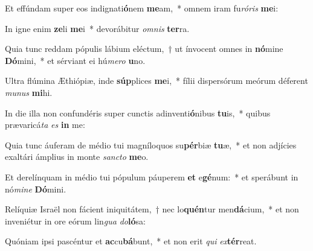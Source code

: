 \item Et effúndam super eos indignati\textbf{ó}nem \textbf{me}am,~* omnem iram fu\textit{ró}\textit{ris} \textbf{me}i:
\item In igne enim \textbf{ze}li \textbf{me}i~* devorábitur \textit{om}\textit{nis} \textbf{ter}ra.
\item Quia tunc reddam pópulis lábium eléctum,~† ut ínvocent omnes in \textbf{nó}mine \textbf{Dó}mini,~* et sérviant ei hú\textit{me}\textit{ro} \textbf{u}no.
\item Ultra flúmina Æthiópiæ, inde \textbf{súp}plices \textbf{me}i,~* fílii dispersórum meórum déferent \textit{mu}\textit{nus} \textbf{mi}hi.
\item In die illa non confundéris super cunctis adinventi\textbf{ó}nibus \textbf{tu}is,~* quibus prævaricá\textit{ta} \textit{es} \textbf{in} me:
\item Quia tunc áuferam de médio tui magníloquos su\textbf{pér}biæ \textbf{tu}æ,~* et non adjícies exaltári ámplius in monte \textit{sanc}\textit{to} \textbf{me}o.
\item Et derelínquam in médio tui pópulum páuperem \textbf{et} e\textbf{gé}num:~* et sperábunt in nó\textit{mi}\textit{ne} \textbf{Dó}mini.
\item Relíquiæ Israël non fácient iniquitátem,~† nec lo\textbf{quén}tur men\textbf{dá}cium,~* et non inveniétur in ore eórum lin\textit{gua} \textit{do}\textbf{ló}sa:
\item Quóniam ipsi pascéntur et \textbf{ac}cu\textbf{bá}bunt,~* et non erit \textit{qui} \textit{ex}\textbf{tér}reat.
